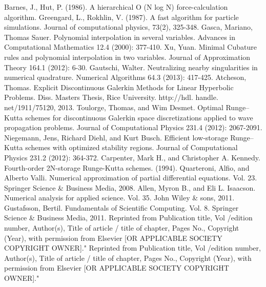 \documentclass[letterpaper,12pt]{report}
\begin{document}
\begin{thebibliography}{9}
Barnes, J.,  Hut, P. (1986). A hierarchical O (N log N) force-calculation algorithm.
Greengard, L.,  Rokhlin, V. (1987). A fast algorithm for particle simulations. Journal of computational physics, 73(2), 325-348.
Gasca, Mariano, Thomas Sauer. Polynomial interpolation in several variables. Advances in Computational Mathematics 12.4 (2000): 377-410.
Xu, Yuan. Minimal Cubature rules and polynomial interpolation in two variables. Journal of Approximation Theory 164.1 (2012): 6-30.
Gautschi, Walter. Neutralizing nearby singularities in numerical quadrature. Numerical Algorithms 64.3 (2013): 417-425.
Atcheson, Thomas. Explicit Discontinuous Galerkin Methods for Linear Hyperbolic Problems. Diss. Masters Thesis, Rice University. http://hdl. handle. net/1911/75120, 2013.
Toulorge, Thomas, and Wim Desmet. Optimal Runge–Kutta schemes for discontinuous Galerkin space discretizations applied to wave propagation problems. Journal of Computational Physics 231.4 (2012): 2067-2091.
Niegemann, Jens, Richard Diehl, and Kurt Busch. Efficient low-storage Runge–Kutta schemes with optimized stability regions. Journal of Computational Physics 231.2 (2012): 364-372.
Carpenter, Mark H., and Christopher A. Kennedy. Fourth-order 2N-storage Runge-Kutta schemes. (1994).
Quarteroni, Alfio, and Alberto Valli. Numerical approximation of partial differential equations. Vol. 23. Springer Science \& Business Media, 2008.
Allen, Myron B., and Eli L. Isaacson. Numerical analysis for applied science. Vol. 35. John Wiley \& sons, 2011.
Gustafsson, Bertil. Fundamentals of Scientific Computing. Vol. 8. Springer Science \& Business Media, 2011.
Reprinted from Publication title, Vol /edition number, Author(s), Title of article / title of chapter, Pages No., Copyright (Year), with permission from Elsevier [OR APPLICABLE SOCIETY COPYRIGHT OWNER]."
Reprinted from Publication title, Vol /edition number, Author(s), Title of article / title of chapter, Pages No., Copyright (Year), with permission from Elsevier [OR APPLICABLE SOCIETY COPYRIGHT OWNER]."


\end{thebibliography}
\end{document}
